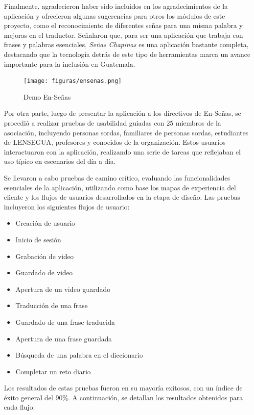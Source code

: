 Finalmente, agradecieron haber sido incluidos en los agradecimientos de la aplicación y ofrecieron algunas sugerencias para otros los módulos de este proyecto, como el reconocimiento de diferentes señas para una misma palabra y mejoras en el traductor. Señalaron que, para ser una aplicación que trabaja con frases y palabras esenciales, \textit{Señas Chapinas} es una aplicación bastante completa, destacando que la tecnología detrás de este tipo de herramientas marca un avance importante para la inclusión en Guatemala.


\begin{figure}  [H]
    \centering
    \texttt{[image: figuras/ensenas.png]}
    \caption{Demo En-Señas}
    \label{fig:enter-label}
\end{figure}

Por otra parte, luego de presentar la aplicación a los directivos de En-Señas, se procedió a realizar pruebas de usabilidad guiadas con 25 miembros de la asociación, incluyendo personas sordas, familiares de personas sordas, estudiantes de LENSEGUA, profesores y conocidos de la organización. Estos usuarios interactuaron con la aplicación, realizando una serie de tareas que reflejaban el uso típico en escenarios del día a día.

Se llevaron a cabo pruebas de camino crítico, evaluando las funcionalidades esenciales de la aplicación, utilizando como base los mapas de experiencia del cliente y los flujos de usuarios desarrollados en la etapa de diseño. Las pruebas incluyeron los siguientes flujos de usuario:

\begin{itemize}
    \item Creación de usuario
    \item Inicio de sesión
    \item Grabación de video
    \item Guardado de video
    \item Apertura de un video guardado
    \item Traducción de una frase
    \item Guardado de una frase traducida
    \item Apertura de una frase guardada
    \item Búsqueda de una palabra en el diccionario
    \item Completar un reto diario
\end{itemize}


Los resultados de estas pruebas fueron en su mayoría exitosos, con un índice de éxito general del 90\%. A continuación, se detallan los resultados obtenidos para cada flujo:

